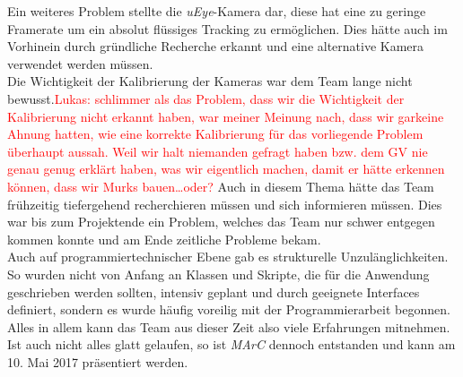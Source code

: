 Ein weiteres Problem stellte die \textit{uEye}-Kamera dar, diese hat eine zu geringe Framerate um ein absolut flüssiges Tracking zu ermöglichen. Dies hätte auch im Vorhinein durch gründliche Recherche erkannt und eine alternative Kamera verwendet werden müssen.\\
Die Wichtigkeit der Kalibrierung der Kameras war dem Team lange nicht bewusst.\textcolor{red}{Lukas: schlimmer als das Problem, dass wir die Wichtigkeit der Kalibrierung nicht erkannt haben, war meiner Meinung nach, dass wir garkeine Ahnung hatten, wie eine korrekte Kalibrierung für das vorliegende Problem überhaupt aussah. Weil wir halt niemanden gefragt haben bzw. dem GV nie genau genug erklärt haben, was wir eigentlich machen, damit er hätte erkennen können, dass wir Murks bauen\dots oder?} Auch in diesem Thema hätte das Team frühzeitig tiefergehend recherchieren müssen und sich informieren müssen. Dies war bis zum Projektende ein Problem, welches das Team nur schwer entgegen kommen konnte und am Ende zeitliche Probleme bekam.\\
Auch auf programmiertechnischer Ebene gab es strukturelle Unzulänglichkeiten. So wurden nicht von Anfang an Klassen und Skripte, die für die Anwendung geschrieben werden sollten, intensiv geplant und durch geeignete Interfaces definiert, sondern es wurde häufig voreilig mit der Programmierarbeit begonnen.\\
Alles in allem kann das Team aus dieser Zeit also viele Erfahrungen mitnehmen. Ist auch nicht alles glatt gelaufen, so ist \textit{MArC} dennoch entstanden und kann am 10. Mai 2017 präsentiert werden.


























